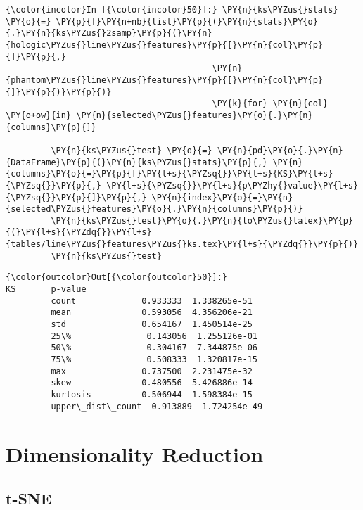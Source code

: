     \begin{Verbatim}[commandchars=\\\{\}]
{\color{incolor}In [{\color{incolor}50}]:} \PY{n}{ks\PYZus{}stats} \PY{o}{=} \PY{p}{[}\PY{n+nb}{list}\PY{p}{(}\PY{n}{stats}\PY{o}{.}\PY{n}{ks\PYZus{}2samp}\PY{p}{(}\PY{n}{hologic\PYZus{}line\PYZus{}features}\PY{p}{[}\PY{n}{col}\PY{p}{]}\PY{p}{,}
                                         \PY{n}{phantom\PYZus{}line\PYZus{}features}\PY{p}{[}\PY{n}{col}\PY{p}{]}\PY{p}{)}\PY{p}{)}
                                         \PY{k}{for} \PY{n}{col} \PY{o+ow}{in} \PY{n}{selected\PYZus{}features}\PY{o}{.}\PY{n}{columns}\PY{p}{]}

         \PY{n}{ks\PYZus{}test} \PY{o}{=} \PY{n}{pd}\PY{o}{.}\PY{n}{DataFrame}\PY{p}{(}\PY{n}{ks\PYZus{}stats}\PY{p}{,} \PY{n}{columns}\PY{o}{=}\PY{p}{[}\PY{l+s}{\PYZsq{}}\PY{l+s}{KS}\PY{l+s}{\PYZsq{}}\PY{p}{,} \PY{l+s}{\PYZsq{}}\PY{l+s}{p\PYZhy{}value}\PY{l+s}{\PYZsq{}}\PY{p}{]}\PY{p}{,} \PY{n}{index}\PY{o}{=}\PY{n}{selected\PYZus{}features}\PY{o}{.}\PY{n}{columns}\PY{p}{)}
         \PY{n}{ks\PYZus{}test}\PY{o}{.}\PY{n}{to\PYZus{}latex}\PY{p}{(}\PY{l+s}{\PYZdq{}}\PY{l+s}{tables/line\PYZus{}features\PYZus{}ks.tex}\PY{l+s}{\PYZdq{}}\PY{p}{)}
         \PY{n}{ks\PYZus{}test}
\end{Verbatim}

            \begin{Verbatim}[commandchars=\\\{\}]
{\color{outcolor}Out[{\color{outcolor}50}]:}                         KS       p-value
         count             0.933333  1.338265e-51
         mean              0.593056  4.356206e-21
         std               0.654167  1.450514e-25
         25\%               0.143056  1.255126e-01
         50\%               0.304167  7.344875e-06
         75\%               0.508333  1.320817e-15
         max               0.737500  2.231475e-32
         skew              0.480556  5.426886e-14
         kurtosis          0.506944  1.598384e-15
         upper\_dist\_count  0.913889  1.724254e-49
\end{Verbatim}

    \section{Dimensionality Reduction}\label{dimensionality-reduction}

\subsection{t-SNE}\label{t-sne}

